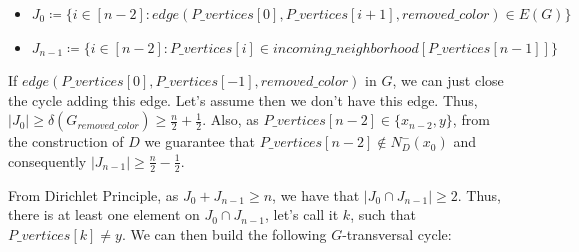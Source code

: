 \begin{itemize}
    \item $J_0 \coloneqq \{i \in [n-2]: edge(P\_vertices[0], P\_vertices[i + 1], removed\_color) \in E(G)\}$
    \item $J_{n-1} \coloneqq \{i \in [n-2]: P\_vertices[i] \in incoming\_neighborhood[P\_vertices[n - 1]]\}$
\end{itemize}


If $edge(P\_vertices[0], P\_vertices[-1], removed\_color)$ in $G$, we can just 
close the cycle adding this edge. Let's assume then we don't have this edge. 
Thus, $|J_0| \geq \delta(G_{removed\_color}) \geq \frac{n}{2} + \frac{1}{2}$. Also, as $P\_vertices[n-2] \in \{x_{n-2}, y\}$, 
from the construction of $D$ we guarantee that $P\_vertices[n-2] \notin N^-_D(x_0)$
and consequently $|J_{n-1}| \geq \frac{n}{2} - \frac{1}{2}$.

From Dirichlet Principle, as $J_0 + J_{n-1} \geq n$, we have that $|J_0 \cap J_{n-1}| \geq 2$. Thus,
there is at least one element on $J_0 \cap J_{n-1}$, let's call it $k$, such that $P\_vertices[k] \neq y$.
We can then build the following $G$-transversal cycle:

